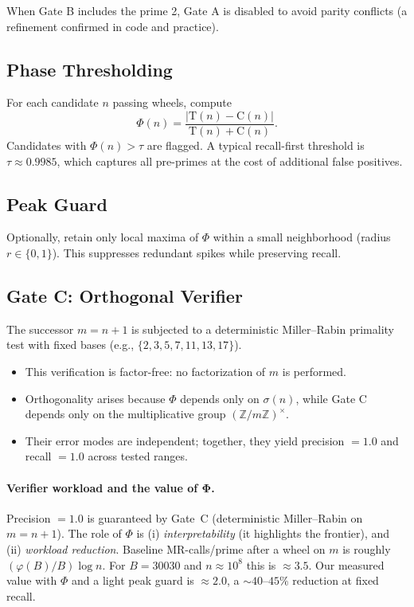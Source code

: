\documentclass[11pt]{article}
\theoremstyle{plain}
\theoremstyle{definition}
\newcommand{\tension}{\mathrm{T}}                           %
\newcommand{\curv}{\mathrm{C}}                              %
\newcommand{\phidet}{\Phi}                                  %
\begin{document}
When Gate B includes the prime 2, Gate A is disabled to avoid parity conflicts (a refinement confirmed in code and practice).

\subsection{Phase Thresholding}
For each candidate $n$ passing wheels, compute
\[
\phidet(n) = \frac{|\tension(n) - \curv(n)|}{\tension(n) + \curv(n)}.
\]
Candidates with $\phidet(n) > \tau$ are flagged. A typical recall-first threshold is $\tau \approx 0.9985$, which captures all pre-primes at the cost of additional false positives.

\subsection{Peak Guard}
Optionally, retain only local maxima of $\phidet$ within a small neighborhood (radius $r \in \{0,1\}$). This suppresses redundant spikes while preserving recall.

\subsection{Gate C: Orthogonal Verifier}
The successor $m=n+1$ is subjected to a deterministic Miller–Rabin primality test with fixed bases (e.g., $\{2,3,5,7,11,13,17\}$).  
\begin{itemize}
  \item This verification is factor-free: no factorization of $m$ is performed.  
  \item Orthogonality arises because $\Phi$ depends only on $\sigma(n)$, while Gate C depends only on the multiplicative group $(\mathbb{Z}/m\mathbb{Z})^\times$.  
  \item Their error modes are independent; together, they yield precision $=1.0$ and recall $=1.0$ across tested ranges.  
\end{itemize}

\paragraph{Verifier workload and the value of $\boldsymbol{\Phi}$.}
Precision $=1.0$ is guaranteed by Gate~C (deterministic Miller–Rabin on $m=n+1$). The role of $\Phi$ is (i) \emph{interpretability} (it highlights the frontier), and (ii) \emph{workload reduction}. Baseline MR-calls/prime after a wheel on $m$ is roughly $(\varphi(B)/B)\log n$. For $B=30030$ and $n\approx 10^8$ this is $\approx 3.5$. Our measured value with $\Phi$ and a light peak guard is $\approx 2.0$, a $\sim 40$–$45\%$ reduction at fixed recall.
\end{document}
